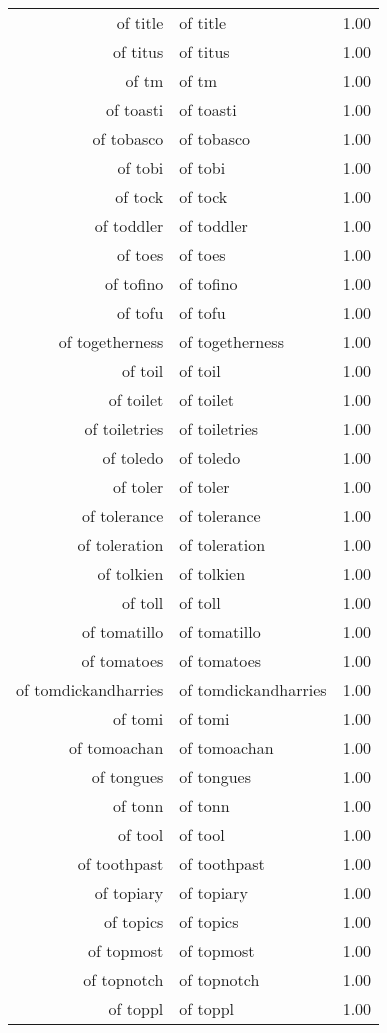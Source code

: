 \begin{table}[ht]
\begin{tabular}{rlr}
  of title & of title & 1.00 \\ 
  of titus & of titus & 1.00 \\ 
  of tm & of tm & 1.00 \\ 
  of toasti & of toasti & 1.00 \\ 
  of tobasco & of tobasco & 1.00 \\ 
  of tobi & of tobi & 1.00 \\ 
  of tock & of tock & 1.00 \\ 
  of toddler & of toddler & 1.00 \\ 
  of toes & of toes & 1.00 \\ 
  of tofino & of tofino & 1.00 \\ 
  of tofu & of tofu & 1.00 \\ 
  of togetherness & of togetherness & 1.00 \\ 
  of toil & of toil & 1.00 \\ 
  of toilet & of toilet & 1.00 \\ 
  of toiletries & of toiletries & 1.00 \\ 
  of toledo & of toledo & 1.00 \\ 
  of toler & of toler & 1.00 \\ 
  of tolerance & of tolerance & 1.00 \\ 
  of toleration & of toleration & 1.00 \\ 
  of tolkien & of tolkien & 1.00 \\ 
  of toll & of toll & 1.00 \\ 
  of tomatillo & of tomatillo & 1.00 \\ 
  of tomatoes & of tomatoes & 1.00 \\ 
  of tomdickandharries & of tomdickandharries & 1.00 \\ 
  of tomi & of tomi & 1.00 \\ 
  of tomoachan & of tomoachan & 1.00 \\ 
  of tongues & of tongues & 1.00 \\ 
  of tonn & of tonn & 1.00 \\ 
  of tool & of tool & 1.00 \\ 
  of toothpast & of toothpast & 1.00 \\ 
  of topiary & of topiary & 1.00 \\ 
  of topics & of topics & 1.00 \\ 
  of topmost & of topmost & 1.00 \\ 
  of topnotch & of topnotch & 1.00 \\ 
  of toppl & of toppl & 1.00 \\ 

\end{tabular}
\end{table}
